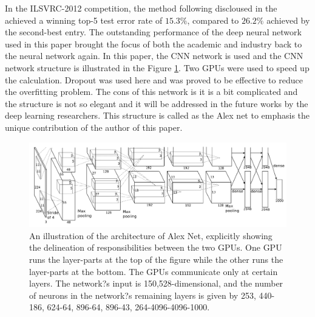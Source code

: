 \documentclass[a4paper,12pt]{article}
\begin{document}
In the ILSVRC-2012 competition, the method following discloused in the \cite{NIPS2012_4824} achieved a winning top-5 test error rate of $15.3\%$, compared to $26.2\%$ achieved by the second-best entry. The outstanding performance of the deep neural network used in this paper brought the focus of both the academic and industry back to the neural network again. In this paper, the CNN network is used and the CNN network structure is illustrated in the Figure \ref{fig:alexnet}. Two GPUs were used to speed up the calculation. Dropout \cite{DBLP:journals/corr/abs-1207-0580} was used here and was proved to be effective to reduce the overfitting problem. The cons of this network is it is a bit complicated and the structure is not so elegant and it will be addressed in the future works by the deep learning researchers. This structure is called as the Alex net to emphasis the unique contribution of the author of this paper.\\


 \begin{figure}[H]
  \begin{center}
      \includegraphics[scale=0.55]{alexnet.png}
\end{center}
\caption{An illustration of the architecture of Alex Net, explicitly showing the delineation of responsibilities between the two GPUs. One GPU runs the layer-parts at the top of the figure while the other runs the layer-parts at the bottom. The GPUs communicate only at certain layers. The network?s input is 150,528-dimensional, and the number of neurons in the network?s remaining layers is given by 253, 440-186, 624-64, 896-64, 896-43, 264-4096-4096-1000\cite{NIPS2012_4824}.}
 \label{fig:alexnet}
 \end{figure}
\end{document}
